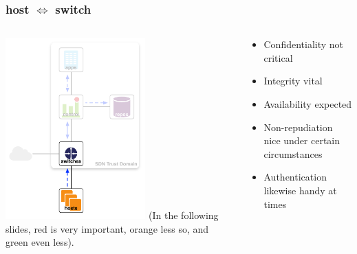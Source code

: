 \documentclass[t,handout]{beamer}
\begin{document}
\begin{frame}
\frametitle{host $\Longleftrightarrow$ switch}
\begin{columns}[T]
\includegraphics[height=2.75in]{ra-h-sw}
(In the following slides, {\color{red} red} is very important, {\color{orange} orange} less so, and {\color{green} green} even less).
\\~\\
\begin{beamerboxesrounded}[shadow]{}
\begin{itemize}
\item {\color{orange} Confidentiality not critical}
\item {\color{red} Integrity vital}
\item {\color{orange} Availability expected} 
\item {\color{green} Non-repudiation nice under certain circumstances}
\item {\color{green} Authentication likewise handy at times}
\end{itemize}
\end{beamerboxesrounded}
\end{columns}
\end{frame}
\end{document}
